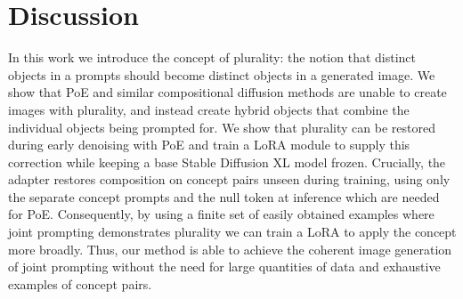 \documentclass{article} %
\begin{document}
%

\FloatBarrier
\section{Discussion}
\label{sec:conclusion}
In this work we introduce the concept of plurality: the notion that distinct objects in a prompts should become distinct objects in a generated image. We show that PoE and similar compositional diffusion methods are unable to create images with plurality, and instead create hybrid objects that combine the individual objects being prompted for. We show that plurality can be restored during early denoising with PoE and train a LoRA module to supply this correction while keeping a base Stable Diffusion XL model frozen. Crucially, the adapter restores composition on concept pairs unseen during training, using only the separate concept prompts and the null token at inference which are needed for PoE. Consequently, by using a finite set of easily obtained examples where joint prompting demonstrates plurality we can train a LoRA to apply the concept more broadly. Thus, our method is able to achieve the coherent image generation of joint prompting without the need for large quantities of data and exhaustive examples of concept pairs.
\end{document}
